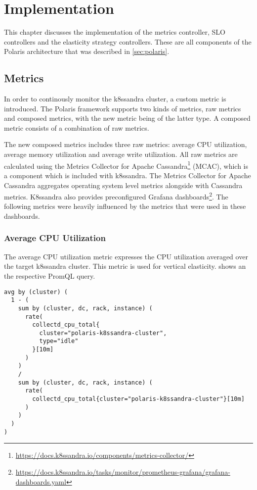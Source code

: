 \chapter{Implementation}
\label{ch:implementation}

This chapter discusses the implementation of the metrics controller, SLO controllers and the elasticity strategy controllers. These are all components of the Polaris architecture that was described in \cref{sec:polaris}.
\section{Metrics}
\label{sec:metrics}

In order to continously monitor the k8ssandra cluster, a custom metric is introduced. The Polaris framework supports two kinds of metrics, raw metrics and composed metrics, with the new metric being of the latter type. A composed metric consists of a combination of raw metrics.

The new composed metrics includes three raw metrics: average CPU utilization, average memory utilization and average write utilization. All raw metrics are calculated using the Metrics Collector for Apache Cassandra\footnote{\url{https://docs.k8ssandra.io/components/metrics-collector/}} (MCAC), which is a component which is included with k8ssandra. The Metrics Collector for Apache Cassandra aggregates operating system level metrics alongside with Cassandra metrics. K8ssandra also provides preconfigured Grafana dashboards\footnote{\raggedright\url{https://docs.k8ssandra.io/tasks/monitor/prometheus-grafana/grafana-dashboards.yaml}}. The following metrics were heavily influenced by the metrics that were used in these dashboards.

\subsection{Average CPU Utilization}

The average CPU utilization metric expresses the CPU utilization averaged over the target k8ssandra cluster. This metric is used for vertical elasticity.  shows an the respective PromQL query.

\begin{lstlisting}[caption={PromQL query used for the average CPU utilisation metric},
                    captionpos=b,
                    label=lst:avgCpuUtilization,
                    float]
avg by (cluster) (
  1 - (
    sum by (cluster, dc, rack, instance) (
      rate(
        collectd_cpu_total{
          cluster="polaris-k8ssandra-cluster",
          type="idle"
        }[10m]
      )
    )
    /
    sum by (cluster, dc, rack, instance) (
      rate(
        collectd_cpu_total{cluster="polaris-k8ssandra-cluster"}[10m]
      )
    )
  )
)
\end{lstlisting}

